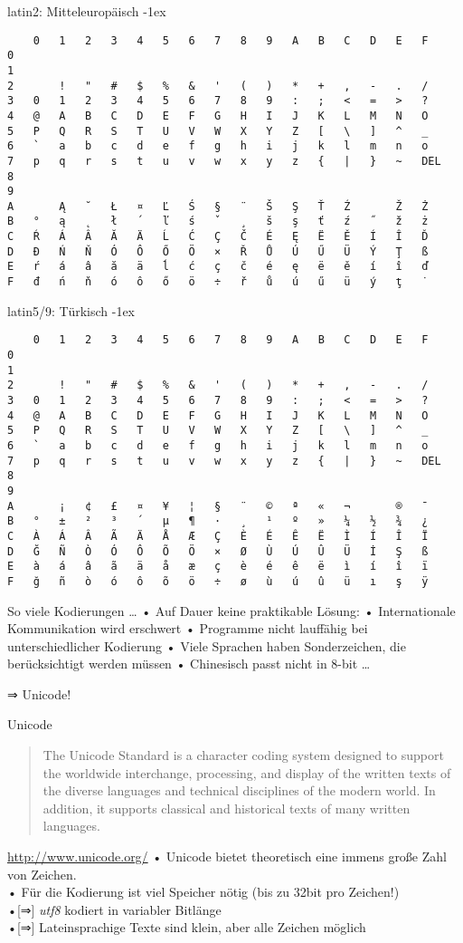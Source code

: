 \begin{frame}[fragile]{latin2: Mitteleuropäisch}
\kern-1ex\small
\begin{verbatim}
  	0 	1 	2 	3 	4 	5 	6 	7 	8 	9 	A 	B 	C 	D 	E 	F
0
1
2 	  	! 	" 	# 	$ 	% 	& 	' 	( 	) 	* 	+ 	, 	- 	. 	/
3 	0 	1 	2 	3 	4 	5 	6 	7 	8 	9 	: 	; 	< 	= 	> 	?
4 	@ 	A 	B 	C 	D 	E 	F 	G 	H 	I 	J 	K 	L 	M 	N 	O
5 	P 	Q 	R 	S 	T 	U 	V 	W 	X 	Y 	Z 	[ 	\ 	] 	^ 	_
6 	` 	a 	b 	c 	d 	e 	f 	g 	h 	i 	j 	k 	l 	m 	n 	o
7 	p 	q 	r 	s 	t 	u 	v 	w 	x 	y 	z 	{ 	| 	} 	~ 	DEL
8 	
9 	
A 	  	Ą 	˘ 	Ł 	¤ 	Ľ 	Ś 	§ 	¨ 	Š 	Ş 	Ť 	Ź 	  	Ž 	Ż
B 	° 	ą 	˛ 	ł 	´ 	ľ 	ś 	ˇ 	¸ 	š 	ş 	ť 	ź 	˝ 	ž 	ż
C 	Ŕ 	Á 	Â 	Ă 	Ä 	Ĺ 	Ć 	Ç 	Č 	É 	Ę 	Ë 	Ě 	Í 	Î 	Ď
D 	Đ 	Ń 	Ň 	Ó 	Ô 	Ő 	Ö 	× 	Ř 	Ů 	Ú 	Ű 	Ü 	Ý 	Ţ 	ß
E 	ŕ 	á 	â 	ă 	ä 	ĺ 	ć 	ç 	č 	é 	ę 	ë 	ě 	í 	î 	ď
F 	đ 	ń 	ň 	ó 	ô 	ő 	ö 	÷ 	ř 	ů 	ú 	ű 	ü 	ý 	ţ 	˙
\end{verbatim}
\end{frame}
\begin{frame}[fragile]{latin5/9: Türkisch}
\kern-1ex\small
\begin{verbatim}
  	0 	1 	2 	3 	4 	5 	6 	7 	8 	9 	A 	B 	C 	D 	E 	F
0
1
2 	  	! 	" 	# 	$ 	% 	& 	' 	( 	) 	* 	+ 	, 	- 	. 	/
3 	0 	1 	2 	3 	4 	5 	6 	7 	8 	9 	: 	; 	< 	= 	> 	?
4 	@ 	A 	B 	C 	D 	E 	F 	G 	H 	I 	J 	K 	L 	M 	N 	O
5 	P 	Q 	R 	S 	T 	U 	V 	W 	X 	Y 	Z 	[ 	\ 	] 	^ 	_
6 	` 	a 	b 	c 	d 	e 	f 	g 	h 	i 	j 	k 	l 	m 	n 	o
7 	p 	q 	r 	s 	t 	u 	v 	w 	x 	y 	z 	{ 	| 	} 	~ 	DEL
8
9
A 	  	¡ 	¢ 	£ 	¤ 	¥ 	¦ 	§ 	¨ 	© 	ª 	« 	¬ 	  	® 	¯
B 	° 	± 	² 	³ 	´ 	µ 	¶ 	· 	¸ 	¹ 	º 	» 	¼ 	½ 	¾ 	¿
C 	À 	Á 	Â 	Ã 	Ä 	Å 	Æ 	Ç 	È 	É 	Ê 	Ë 	Ì 	Í 	Î 	Ï
D 	Ğ 	Ñ 	Ò 	Ó 	Ô 	Õ 	Ö 	× 	Ø 	Ù 	Ú 	Û 	Ü 	İ 	Ş 	ß
E 	à 	á 	â 	ã 	ä 	å 	æ 	ç 	è 	é 	ê 	ë 	ì 	í 	î 	ï
F 	ğ 	ñ 	ò 	ó 	ô 	õ 	ö 	÷ 	ø 	ù 	ú 	û 	ü 	ı 	ş 	ÿ
\end{verbatim}
\end{frame}

\begin{frame}{So viele Kodierungen …}
• Auf Dauer keine praktikable Lösung:
• Internationale Kommunikation wird erschwert
• Programme nicht lauffähig bei unterschiedlicher Kodierung
• Viele Sprachen haben Sonderzeichen, die berücksichtigt werden müssen
• Chinesisch passt nicht in 8-bit …
\•
\pause
\centerline{\Large ⇒ Unicode!}
\end{frame}

\begin{frame}{Unicode}
\begin{quotation}
The Unicode Standard is a character coding system designed to support the worldwide interchange, processing, and display of the written texts of the diverse languages and technical disciplines of the modern world. In addition, it supports classical and historical texts of many written languages.\\
\end{quotation}
\url{http://www.unicode.org/}
\pause 
• Unicode bietet theoretisch eine immens große Zahl von Zeichen.\\
• Für die Kodierung ist viel Speicher nötig (bis zu 32bit pro Zeichen!)\\
•[⇒] \emph{utf8} kodiert in variabler Bitlänge\\
•[⇒] Lateinsprachige Texte sind klein, aber alle Zeichen möglich
\•
\end{frame}

